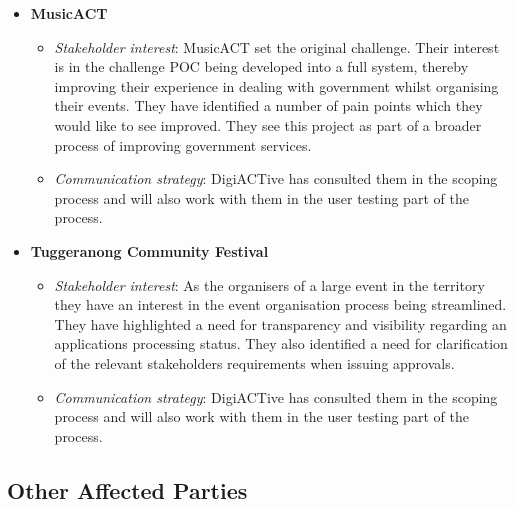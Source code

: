 \documentclass[12pt,a4paper,twosided]{article}
\begin{document}
\begin{itemize}
\itemsep1pt\parskip0pt
\item
  \textbf{MusicACT}

  \begin{itemize}
  \itemsep1pt\parskip0pt
  \item
    \emph{Stakeholder interest}: MusicACT set the original challenge.
    Their interest is in the challenge POC being developed into a full
    system, thereby improving their experience in dealing with
    government whilst organising their events. They have identified a
    number of pain points which they would like to see improved. They
    see this project as part of a broader process of improving
    government services.
  \item
    \emph{Communication strategy}: DigiACTive has consulted them in the
    scoping process and will also work with them in the user testing
    part of the process.
  \end{itemize}
\item
  \textbf{Tuggeranong Community Festival}

  \begin{itemize}
  \itemsep1pt\parskip0pt
  \item
    \emph{Stakeholder interest}: As the organisers of a large event in
    the territory they have an interest in the event organisation
    process being streamlined. They have highlighted a need for
    transparency and visibility regarding an applications processing
    status. They also identified a need for clarification of the
    relevant stakeholders requirements when issuing approvals.
  \item
    \emph{Communication strategy}: DigiACTive has consulted them in the
    scoping process and will also work with them in the user testing
    part of the process.
  \end{itemize}
\end{itemize}

\subsection{Other Affected Parties}
\end{document}
